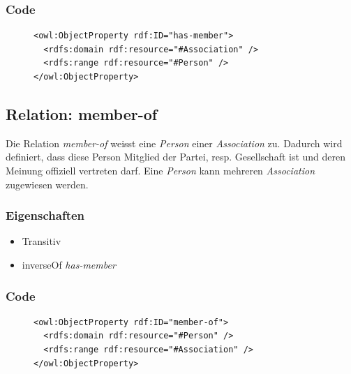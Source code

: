 \documentclass[
    11pt,
    latin1,
    a4paper,
    oneside
]{scrreprt}
\begin{document}
\subsubsection{Code} \label{sec:rel_hasmember_code}

\begin{figure}[H]
 \lstset{language=XML}
 \begin{lstlisting}[label=owl:ahsmember,caption={Die Relation \emph{has-member} enth\"allt alle Mitglieder der \emph{Association}}]
<owl:ObjectProperty rdf:ID="has-member">
  <rdfs:domain rdf:resource="#Association" />
  <rdfs:range rdf:resource="#Person" />
</owl:ObjectProperty>
 \end{lstlisting}
\end{figure}


\subsection{Relation: member-of} \label{sec:rel_memberof}

Die Relation \emph{member-of} weisst eine \emph{Person} einer \emph{Association} zu. Dadurch wird definiert, dass diese Person Mitglied der Partei, resp. Gesellschaft ist und deren Meinung offiziell vertreten darf. Eine \emph{Person} kann mehreren \emph{Association} zugewiesen werden.

\subsubsection{Eigenschaften} \label{sec:rel_memberof_settings}

\begin{itemize}
  \item Transitiv
  \item inverseOf \emph{has-member}
\end{itemize}

\subsubsection{Code} \label{sec:rel_memberof_code}

\begin{figure}[H]
 \lstset{language=XML}
 \begin{lstlisting}[label=owl:memberof,caption={Die Relation \emph{member-of} gibt alle \emph{Association} an, bei welcher die Person Mitglied ist}]
<owl:ObjectProperty rdf:ID="member-of">
  <rdfs:domain rdf:resource="#Person" />
  <rdfs:range rdf:resource="#Association" />
</owl:ObjectProperty>
 \end{lstlisting}
\end{figure}
\end{document}
